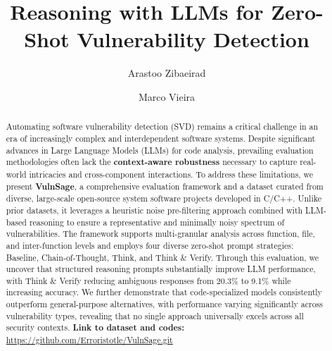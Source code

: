\documentclass[sigconf]{acmart}
\begin{document}
\title{Reasoning with LLMs for Zero-Shot Vulnerability Detection}

\author{Arastoo Zibaeirad}

\author{Marco Vieira}

\begin{abstract}
Automating software vulnerability detection (SVD) remains a critical challenge in an era of increasingly complex and interdependent software systems. Despite significant advances in Large Language Models (LLMs) for code analysis, prevailing evaluation methodologies often lack the \textbf{context-aware robustness} necessary to capture real-world intricacies and cross-component interactions. To address these limitations, we present \textbf{VulnSage}, a comprehensive evaluation framework and a dataset curated from diverse, large-scale open-source system software projects developed in C/C++. Unlike prior datasets, it leverages a heuristic noise pre-filtering approach combined with LLM-based reasoning to ensure a representative and minimally noisy spectrum of vulnerabilities. The framework supports multi-granular analysis across function, file, and inter-function levels and employs four diverse zero-shot prompt strategies: Baseline, Chain-of-Thought, Think, and Think \& Verify.
Through this evaluation, we uncover that structured reasoning prompts substantially improve LLM performance, with Think \& Verify reducing ambiguous responses from 20.3\% to 9.1\% while increasing accuracy. We further demonstrate that code-specialized models consistently outperform general-purpose alternatives, with performance varying significantly across vulnerability types, revealing that no single approach universally excels across all security contexts. \textbf{Link to dataset and codes:} \href{https://github.com/Erroristotle/VulnSage.git}{https://github.com/Erroristotle/VulnSage.git}


\end{abstract}




\maketitle
\end{document}
